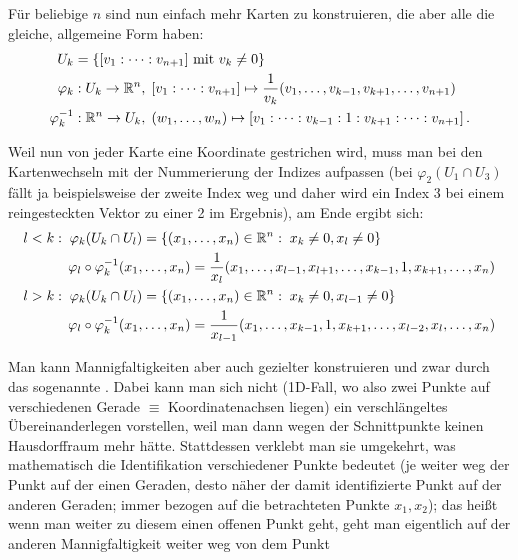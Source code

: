 \documentclass[../H_Analysis_main.tex]{subfiles}
\begin{document}
\begin{bsp}
Für beliebige $n$ sind nun einfach mehr Karten zu konstruieren, die aber alle die gleiche, allgemeine Form haben:
\begin{equation}
\begin{split}
U_k &= \qty{[v_1 : \dots : v_{n + 1}] \text{ mit } v_k \neq 0} %
\\
\varphi_k&: U_k \rightarrow \mathbb{R}^n, \; [v_1 : \dots : v_{n + 1}] \mapsto \frac{1}{v_k} (v_1, \dots, v_{k - 1}, v_{k + 1}, \dots, v_{n + 1}) %
\\
\varphi_k^{-1}&: \mathbb{R}^n \rightarrow U_k, \; (w_1, \dots, w_n) \mapsto [v_1 : \dots : v_{k - 1} : 1 : v_{k + 1} : \dots : v_{n + 1}] \, . %
\end{split}
\end{equation}

Weil nun von jeder Karte eine Koordinate gestrichen wird, muss man bei den Kartenwechseln mit der Nummerierung der Indizes aufpassen (bei $\varphi_2(U_1 \cap U_3)$ fällt ja beispielsweise der zweite Index weg und daher wird ein Index 3 bei einem reingesteckten Vektor zu einer 2 im Ergebnis), am Ende ergibt sich:
\begin{equation*}
\begin{split}
l < k&: \; \varphi_k(U_k \cap U_l) = \qty{(x_1, \dots, x_n) \in \mathbb{R}^n: \; x_k \neq 0, x_l \neq 0}
\\
& \quad \varphi_l \circ \varphi_k^{-1}(x_1, \dots, x_n) = \frac{1}{x_l} (x_1, \dots, x_{l - 1}, x_{l + 1}, \dots, x_{k - 1}, 1, x_{k + 1}, \dots, x_n)
\\
l > k&: \; \varphi_k(U_k \cap U_l) = \qty{(x_1, \dots, x_n) \in \mathbb{R}^n: \; x_k \neq 0, x_{l - 1} \neq 0}
\\
& \quad \varphi_l \circ \varphi_k^{-1}(x_1, \dots, x_n) = \frac{1}{x_{l - 1}} (x_1, \dots, x_{k - 1}, 1, x_{k + 1}, \dots, x_{l - 2}, x_l, \dots, x_n)
\end{split}
\end{equation*}
\end{bsp}


Man kann Mannigfaltigkeiten aber auch gezielter konstruieren und zwar durch das sogenannte . Dabei kann man sich nicht (1D-Fall, wo also zwei Punkte auf verschiedenen Gerade $\equiv$ Koordinatenachsen liegen) ein verschlängeltes Übereinanderlegen vorstellen, weil man dann wegen der Schnittpunkte keinen Hausdorffraum mehr hätte. Stattdessen verklebt man sie umgekehrt, was mathematisch die Identifikation verschiedener Punkte bedeutet (je weiter weg der Punkt auf der einen Geraden, desto näher der damit identifizierte Punkt auf der anderen Geraden; immer bezogen auf die betrachteten Punkte $x_1, x_2$); das heißt wenn man weiter zu diesem einen offenen Punkt geht, geht man eigentlich auf der anderen Mannigfaltigkeit weiter weg von dem Punkt
\end{document}
